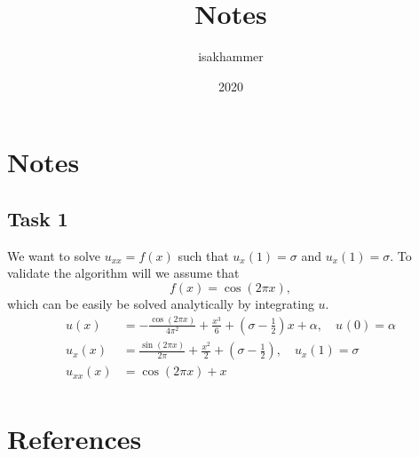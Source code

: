 \documentclass{article}
\title{Notes}
\author{isakhammer }
\date{2020}
\theoremstyle{remark}
\begin{document}
\maketitle
\tableofcontents
\newpage

\newpage
\section{Notes}%
\label{sec:notes}


\subsection{Task 1}%
\label{sub:task_1}


We want to solve $u_{xx} = f\left( x \right)$ such that $u_{x}\left( 1 \right) = \sigma $ and $u _{x}\left( 1 \right) =
\sigma $. To validate the algorithm
will we assume that \[
f\left( x \right) = \cos \left( 2 \pi x \right),
\]
which can be easily be solved analytically by integrating $u$.\[
    \begin{split}
u\left( x \right)  & =  - \frac{\cos \left( 2\pi x \right)}{ 4 \pi ^{2}} +  \frac{x^{3}}{6} +  \left( \sigma  - \frac{1}{2} \right)x +  \alpha, \quad u_{}\left( 0 \right) = \alpha    \\
    u_{x}\left( x \right) &=   \frac{\sin \left( 2 \pi x \right)}{2 \pi } + \frac{x^{2}}{2} + \left( \sigma -
    \frac{1}{2} \right), \quad u_{x}\left( 1 \right) = \sigma      \\
    u_{xx} \left( x \right) &= \cos \left( 2 \pi x \right)  + x \\
    \end{split}
\]




\newpage
\section{References}%
\label{sec:references}



\end{document}
